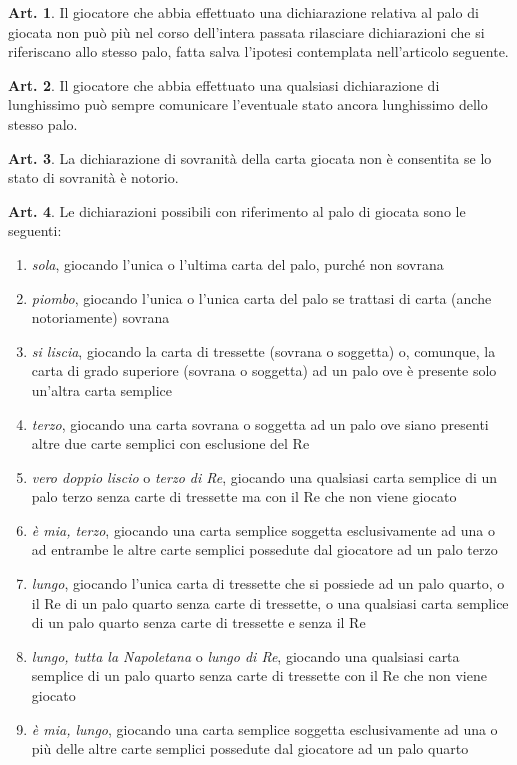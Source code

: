 \documentclass[italian,a4paper]{article}
\theoremstyle{definition}
\newtheorem{art}{Art.}
\begin{document}
\begin{art}
Il giocatore che abbia effettuato una dichiarazione relativa al palo di giocata non può più nel corso dell'intera passata rilasciare dichiarazioni che si riferiscano allo stesso palo, fatta salva l'ipotesi contemplata nell'articolo seguente.
\end{art}
\begin{art}
Il giocatore che abbia effettuato una qualsiasi dichiarazione di lunghissimo può sempre comunicare l'eventuale stato ancora lunghissimo dello stesso palo.
\end{art}
\begin{art}
La dichiarazione di sovranità della carta giocata non è consentita se lo stato di sovranità è notorio.
\end{art}
\begin{art}
Le dichiarazioni possibili con riferimento al palo di giocata  sono le seguenti:
\begin{enumerate}
\item \emph{sola},  giocando l'unica o l'ultima carta del palo, purché non sovrana
\item \emph{piombo},  giocando l'unica o l'unica carta del palo se trattasi di carta (anche notoriamente) sovrana
\item \emph{si liscia},  giocando la carta di tressette (sovrana o soggetta) o, comunque, la carta di grado superiore (sovrana o soggetta) ad un palo ove è presente solo un'altra carta semplice
\item \emph{terzo},  giocando una carta sovrana o soggetta ad un palo ove siano presenti altre due carte semplici con esclusione del Re
\item \emph{vero doppio liscio} o \emph{terzo di Re},  giocando una qualsiasi carta semplice di un palo terzo senza carte di tressette ma con il Re che non viene giocato
\item \emph{è mia, terzo},  giocando una carta semplice soggetta esclusivamente ad una o ad entrambe le altre carte semplici possedute dal giocatore ad un palo terzo
\item \emph{lungo},  giocando l'unica carta di tressette che si possiede ad un palo quarto, o il Re di un palo quarto senza carte di tressette, o una qualsiasi carta semplice di un palo quarto senza carte di tressette e senza il Re
\item \emph{lungo, tutta la Napoletana} o \emph{lungo di Re},  giocando una qualsiasi carta semplice di un palo quarto senza carte di tressette con il Re che non viene giocato
\item \emph{è mia, lungo},  giocando una carta semplice soggetta esclusivamente ad una o più delle altre carte semplici possedute dal giocatore ad un palo quarto

\end{enumerate}
\end{art}
\end{document}
